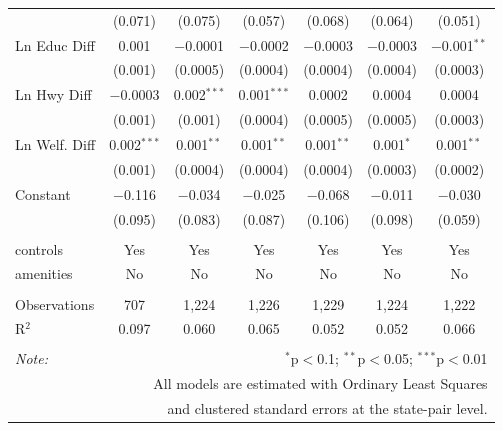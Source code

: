 \begin{table}[!htbp]
\begin{tabular}{@{\extracolsep{5pt}}lcccccc}
  & (0.071) & (0.075) & (0.057) & (0.068) & (0.064) & (0.051) \\ 
  Ln Educ Diff & 0.001 & $-$0.0001 & $-$0.0002 & $-$0.0003 & $-$0.0003 & $-$0.001$^{**}$ \\ 
  & (0.001) & (0.0005) & (0.0004) & (0.0004) & (0.0004) & (0.0003) \\ 
  Ln Hwy Diff & $-$0.0003 & 0.002$^{***}$ & 0.001$^{***}$ & 0.0002 & 0.0004 & 0.0004 \\ 
  & (0.001) & (0.001) & (0.0004) & (0.0005) & (0.0005) & (0.0003) \\ 
  Ln Welf. Diff & 0.002$^{***}$ & 0.001$^{**}$ & 0.001$^{**}$ & 0.001$^{**}$ & 0.001$^{*}$ & 0.001$^{**}$ \\ 
  & (0.001) & (0.0004) & (0.0004) & (0.0004) & (0.0003) & (0.0002) \\ 
  Constant & $-$0.116 & $-$0.034 & $-$0.025 & $-$0.068 & $-$0.011 & $-$0.030 \\ 
  & (0.095) & (0.083) & (0.087) & (0.106) & (0.098) & (0.059) \\ 
 \hline \\[-1.8ex] 
controls & Yes & Yes & Yes & Yes & Yes & Yes \\ 
amenities & No & No & No & No & No & No \\ 
\hline \\[-1.8ex] 
Observations & 707 & 1,224 & 1,226 & 1,229 & 1,224 & 1,222 \\ 
R$^{2}$ & 0.097 & 0.060 & 0.065 & 0.052 & 0.052 & 0.066 \\ 
\hline 
\hline \\[-1.8ex] 
\textit{Note:}  & \multicolumn{6}{r}{$^{*}$p$<$0.1; $^{**}$p$<$0.05; $^{***}$p$<$0.01} \\ 
 & \multicolumn{6}{r}{All models are estimated with Ordinary Least Squares} \\ 
 & \multicolumn{6}{r}{and clustered standard errors at the state-pair level.} \\ 
\end{tabular} 
\end{table} 
